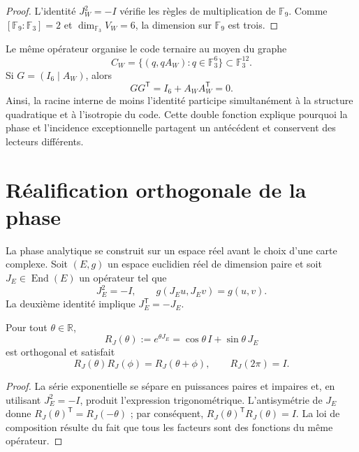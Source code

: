 \begin{proof}
L'identité \(J_W^2=-I\) vérifie les règles de multiplication de
\(\mathbb F_9\). Comme
\([\mathbb F_9:\mathbb F_3]=2\) et
\(\dim_{\mathbb F_3}V_W=6\), la dimension sur \(\mathbb F_9\) est trois.
\end{proof}

Le même opérateur organise le code ternaire au moyen du graphe
\begin{equation}
 C_W=\{(q,qA_W):q\in\mathbb F_3^6\}\subset\mathbb F_3^{12}.
 \label{eq:codigo-grafo-J-anexo}
\end{equation}
Si \(G=(I_6\mid A_W)\), alors
\[
 GG^{\mathsf T}=I_6+A_W A_W^{\mathsf T}=0.
\]
Ainsi, la racine interne de moins l'identité participe simultanément à la
structure quadratique et à l'isotropie du code. Cette double fonction explique
pourquoi la phase et l'incidence exceptionnelle partagent un antécédent et
conservent des lecteurs différents.

\section{Réalification orthogonale de la phase}

La phase analytique se construit sur un espace réel avant le choix d'une carte
complexe. Soit \((E,g)\) un espace euclidien réel de dimension paire et soit
\(J_E\in\operatorname{End}(E)\) un opérateur tel que
\begin{equation}
 J_E^2=-I,
 \qquad
 g(J_Eu,J_Ev)=g(u,v).
 \label{eq:estructura-compleja-ortogonal-anexo}
\end{equation}
La deuxième identité implique \(J_E^{\mathsf T}=-J_E\).

\begin{proposition}
\label{prop:fase-ortogonal-J-anexo}
Pour tout \(\theta\in\mathbb R\),
\begin{equation}
 R_J(\theta):=e^{\theta J_E}
 =\cos\theta\,I+\sin\theta\,J_E
 \label{eq:rotacion-J-anexo}
\end{equation}
est orthogonal et satisfait
\begin{equation}
 R_J(\theta)R_J(\phi)=R_J(\theta+\phi),
 \qquad R_J(2\pi)=I.
 \label{eq:grupo-fase-J-anexo}
\end{equation}
\end{proposition}

\begin{proof}
La série exponentielle se sépare en puissances paires et impaires et, en utilisant
\(J_E^2=-I\), produit l'expression trigonométrique. L'antisymétrie de
\(J_E\) donne
\(R_J(\theta)^{\mathsf T}=R_J(-\theta)\) ; par conséquent,
\(R_J(\theta)^{\mathsf T}R_J(\theta)=I\). La loi de composition résulte du fait
que tous les facteurs sont des fonctions du même opérateur.
\end{proof}

